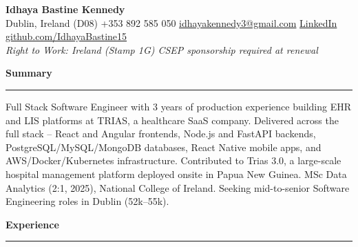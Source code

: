 \documentclass[10pt,letterpaper]{article}
\newcommand{\ressection}[1]{%
  \vspace{4pt}%
  {\large\textbf{#1}}\\[-5pt]%
  \rule{\linewidth}{0.5pt}\par%
  \vspace{2pt}%
}
\begin{document}
\begin{center}
  {\LARGE\textbf{Idhaya Bastine Kennedy}}\\[3pt]
  Dublin, Ireland (D08)
  \textbar{} +353 892 585 050
  \textbar{} \href{mailto:idhayakennedy3@gmail.com}{idhayakennedy3@gmail.com}
  \textbar{} \href{https://www.linkedin.com/in/idhaya-bastine-kennedy-79b15b186/}{LinkedIn}
  \textbar{} \href{https://github.com/IdhayaBastine15}{github.com/IdhayaBastine15}\\[2pt]
  \textit{Right to Work: Ireland (Stamp 1G) \textendash{} CSEP sponsorship required at renewal}
\end{center}

\vspace{-4pt}

\ressection{Summary}
Full Stack Software Engineer with 3 years of production experience building EHR and LIS platforms at TRIAS, a healthcare SaaS company. Delivered across the full stack -- React and Angular frontends, Node.js and FastAPI backends, PostgreSQL/MySQL/MongoDB databases, React Native mobile apps, and AWS/Docker/Kubernetes infrastructure. Contributed to Trias 3.0, a large-scale hospital management platform deployed onsite in Papua New Guinea. MSc Data Analytics (2:1, 2025), National College of Ireland. Seeking mid-to-senior Software Engineering roles in Dublin (\texteuro{}52k--\texteuro{}55k).

\ressection{Experience}
\end{document}
